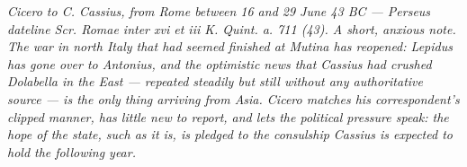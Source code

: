 
\textit{Cicero to C. Cassius, from Rome between 16 and 29 June 43 BC ---
Perseus dateline \textit{Scr. Romae inter xvi et iii K. Quint. a. 711 (43)}.
A short, anxious note. The war in north Italy that had seemed finished at
Mutina has reopened: Lepidus has gone over to Antonius, and the optimistic
news that Cassius had crushed Dolabella in the East --- repeated steadily
but still without any authoritative source --- is the only thing arriving
from Asia. Cicero matches his correspondent's clipped manner, has little
new to report, and lets the political pressure speak: the hope of the
state, such as it is, is pledged to the consulship Cassius is expected to
hold the following year.}
